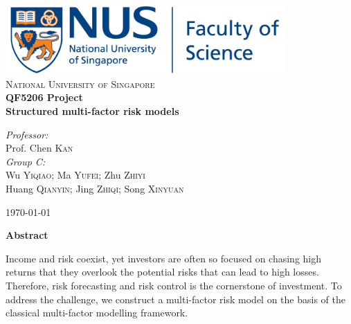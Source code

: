 \documentclass[10pt]{article}
\begin{document}

\thispagestyle{plain}
\newpage
\setcounter{page}{1}

\begin{titlepage}
\begin{center}


\includegraphics[width=0.8\textwidth]{fos-logo.png}\\[1cm]    

\textsc{\LARGE National University of Singapore}\\[1.5cm]


{ \huge \bfseries QF5206 Project}\\[0.4cm]
{ \bfseries Structured multi-factor risk models}\\[0.4cm]


\begin{center}
\emph{Professor:} \\
Prof. Chen \textsc{Kan}\\


\emph{Group C:}\\
Wu \textsc{Yiqiao}; Ma \textsc{Yufei}; Zhu \textsc{Zhiyi}\\
Huang \textsc{Qianyin}; Jing \textsc{Zhiqi}; Song \textsc{Xinyuan}
\end{center}



\vfill
{\large \today}

\end{center}

\end{titlepage}

\begin{center}
    \huge \textbf{Abstract}
\end{center}

\Large
Income and risk coexist, yet investors are often so focused on chasing high returns that they overlook the potential risks that can lead to high losses. Therefore, risk forecasting and risk control is the cornerstone of investment. To address the challenge, we construct a multi-factor risk model on the basis of the classical multi-factor modelling framework. \\
\end{document}
